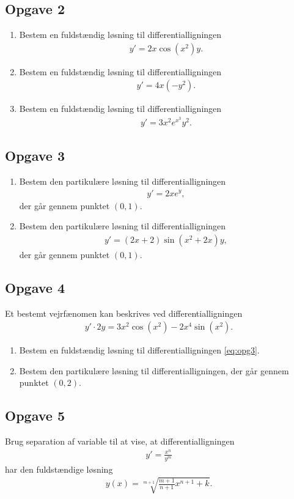\subsection*{Opgave 2}
\begin{enumerate}[label=\roman*)]
	\item Bestem en fuldstændig løsning til differentialligningen 
	\begin{align*}
		y' = 2x\cos(x^2)y.
	\end{align*}
	\item Bestem en fuldstændig løsning til differentialligningen 
	\begin{align*}
		y' = 4x(-y^2).
	\end{align*}
	\item Bestem en fuldstændig løsning til differentialligningen 
	\begin{align*}
		y' = 3x^2e^{x^3}y^2.
	\end{align*}
\end{enumerate}

\subsection*{Opgave 3}
\begin{enumerate}[label=\roman*)]
	\item Bestem den partikulære løsning til differentialligningen
	\begin{align*}
		y' = 2xe^y,
	\end{align*}
	der går gennem punktet $(0,1)$.
	\item Bestem den partikulære løsning til differentialligningen 
	\begin{align*}
		y' = (2x+2)\sin(x^2+2x)y,
	\end{align*}
	der går gennem punktet $(0,1)$. 
\end{enumerate}


\subsection*{Opgave 4}
Et bestemt vejrfænomen kan beskrives ved differentialligningen
\begin{align}\label{eq:opg3}
	y'\cdot 2y = 3x^2\cos(x^2) - 2x^4\sin(x^2).
\end{align}
\begin{enumerate}[label=\roman*)]
	\item Bestem en fuldstændig løsning til differentialligningen \eqref{eq:opg3}.
	\item Bestem den partikulære løsning til differentialligningen, der går gennem punktet $(0,2)$.
\end{enumerate}

\subsection*{Opgave 5}
Brug separation af variable til at vise, at differentialligningen
\begin{align*}
	y' = \frac{x^n}{y^m}
\end{align*}
har den fuldstændige løsning
\begin{align*}
	y(x) = \sqrt[m+1]{\frac{m+1}{n+1}x^{n+1}+k}.
\end{align*}